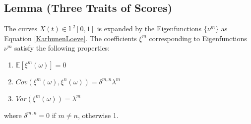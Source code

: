 \documentclass[11pt,twoside,a4paper]{article}
\begin{document}
	\subsection{Lemma (Three Traits of Scores)} \label{Proof1}
	The curves $X(t) \in \mathbb{L}^2[0,1]$ is expanded by the Eigenfunctions $\{\nu^m\}$ as Equation \ref{KarhunenLoeve}. The coefficients $\xi^{m}$ corresponding to Eigenfunctions $\nu^m$ satisfy the following properties:
	
	\begin{multicols}{2}
		\begin{enumerate}
			\item $\mathbb{E}\left[\xi^m(\omega)\right] = 0$
			\item $Cov\left(\xi^m(\omega), \xi^n(\omega)\right) = \delta^{m,n}\lambda^m$%
			\item $Var\left(\xi^m(\omega)\right) = \lambda^m$
		\end{enumerate}
	\end{multicols}

	where $\delta^{m,n} = 0$ if $m \neq n$, otherwise 1.
	
\end{document}
